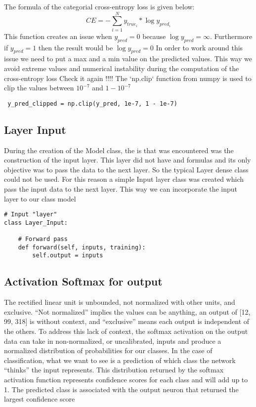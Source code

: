 \documentclass{article}
\begin{document}
The formula of the categorial cross-entropy loss is given below: \\
\begin{equation}
CE = - \sum_{i=1}^{N}{y_{true_i} * \log{y_{pred_i}}}
\end{equation} 
This function creates an issue when $ y_{pred} = 0$ because 
$ \log y_{pred} = \infty$. Furthermore if $ y_{pred} = 1 $ then the result would be $ \log y_{pred} = 0 $  In order to work around this issue we need to put a max and a min value on the predicted values. This way we avoid extreme values and numerical instability during the computation of the cross-entropy loss 
Check it again !!!!   
The `np.clip` function from numpy is used to clip the values between $ 10^{-7}$ and $ 1 - 10^{-7}$
\begin{lstlisting}
 y_pred_clipped = np.clip(y_pred, 1e-7, 1 - 1e-7)
\end{lstlisting}

\subsection{Layer Input}
During the creation of the Model class, the is that was encountered was the construction of the input layer. This layer did not have and formulas and its only objective was to pass the data to the next layer. So the typical Layer dense class could not be used. For this reason a simple Input layer class was created which pass the input data to the next layer. This way we can incorporate the input layer to our class model 

\begin{lstlisting}
# Input "layer"
class Layer_Input:

    # Forward pass
    def forward(self, inputs, training):
        self.output = inputs

\end{lstlisting}

\subsection{Activation Softmax for output}
The rectified linear unit is unbounded, not normalized with other units, and exclusive. “Not normalized” implies the values can be anything, an output of [12, 99, 318] is without context, and “exclusive” means each output is independent of the others. To address this lack of context, the softmax activation on the output data can take in non-normalized, or uncalibrated, inputs and produce a normalized distribution of probabilities for our classes. In the case of classification,
what we want to see is a prediction of which class the network “thinks” the input represents. This distribution returned by the softmax activation function represents confidence scores for each class and will add up to 1. The predicted class is associated with the output neuron that returned
the largest confidence score
\end{document}
